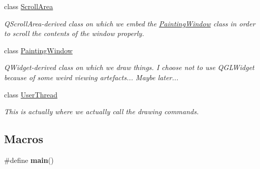 \begin{DoxyCompactItemize}
class \hyperlink{class_d_o_1_1_scroll_area}{Scroll\-Area}
\begin{DoxyCompactList}\small\item\em Q\-Scroll\-Area-\/derived class on which we embed the \hyperlink{class_d_o_1_1_painting_window}{Painting\-Window} class in order to scroll the contents of the window properly. \end{DoxyCompactList}\item 
class \hyperlink{class_d_o_1_1_painting_window}{Painting\-Window}
\begin{DoxyCompactList}\small\item\em Q\-Widget-\/derived class on which we draw things. I choose not to use Q\-G\-L\-Widget because of some weird viewing artefacts... Maybe later... \end{DoxyCompactList}\item 
class \hyperlink{class_d_o_1_1_user_thread}{User\-Thread}
\begin{DoxyCompactList}\small\item\em This is actually where we actually call the drawing commands. \end{DoxyCompactList}\end{DoxyCompactItemize}
\subsection*{Macros}
\begin{DoxyCompactItemize}
\item 
\#define {\bfseries main}()
\end{DoxyCompactItemize}
